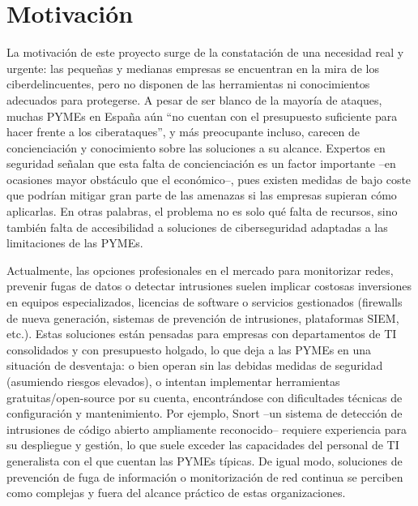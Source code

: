 \documentclass[11pt,a4paper,twoside]{report}
\begin{document}
\section{Motivación}

La motivación de este proyecto surge de la constatación de una necesidad real y urgente: las pequeñas y medianas empresas se encuentran en la mira de los ciberdelincuentes, pero no disponen de las herramientas ni conocimientos adecuados para protegerse. A pesar de ser blanco de la mayoría de ataques, muchas PYMEs en España aún “no cuentan con el presupuesto suficiente para hacer frente a los ciberataques”, y más preocupante incluso, carecen de concienciación y conocimiento sobre las soluciones a su alcance. Expertos en seguridad señalan que esta falta de concienciación es un factor importante –en ocasiones mayor obstáculo que el económico–, pues existen medidas de bajo coste que podrían mitigar gran parte de las amenazas si las empresas supieran cómo aplicarlas. En otras palabras, el problema no es solo qué falta de recursos, sino también falta de accesibilidad a soluciones de ciberseguridad adaptadas a las limitaciones de las PYMEs.\newline

Actualmente, las opciones profesionales en el mercado para monitorizar redes, prevenir fugas de datos o detectar intrusiones suelen implicar costosas inversiones en equipos especializados, licencias de software o servicios gestionados (firewalls de nueva generación, sistemas de prevención de intrusiones, plataformas SIEM, etc.). Estas soluciones están pensadas para empresas con departamentos de TI consolidados y con presupuesto holgado, lo que deja a las PYMEs en una situación de desventaja: o bien operan sin las debidas medidas de seguridad (asumiendo riesgos elevados), o intentan implementar herramientas gratuitas/open-source por su cuenta, encontrándose con dificultades técnicas de configuración y mantenimiento. Por ejemplo, Snort –un sistema de detección de intrusiones de código abierto ampliamente reconocido– requiere experiencia para su despliegue y gestión, lo que suele exceder las capacidades del personal de TI generalista con el que cuentan las PYMEs típicas. De igual modo, soluciones de prevención de fuga de información o monitorización de red continua se perciben como complejas y fuera del alcance práctico de estas organizaciones.\newline
\end{document}
